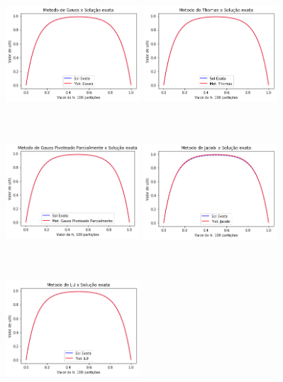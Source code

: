 \documentclass{article}
\begin{document}
\begin{itemize}
\begin{figure}[!htb]
\includegraphics [width=5cm,height=5cm]{G100part.png}
\includegraphics [width=5cm,height=5cm]{T100part}
\includegraphics [width=5cm,height=5cm]{GP100part.png}
\includegraphics [width=5cm,height=5cm]{J100part.png}
\includegraphics [width=5cm,height=5cm]{LU100part.png}

\end{figure}
\end{itemize}
\end{document}
